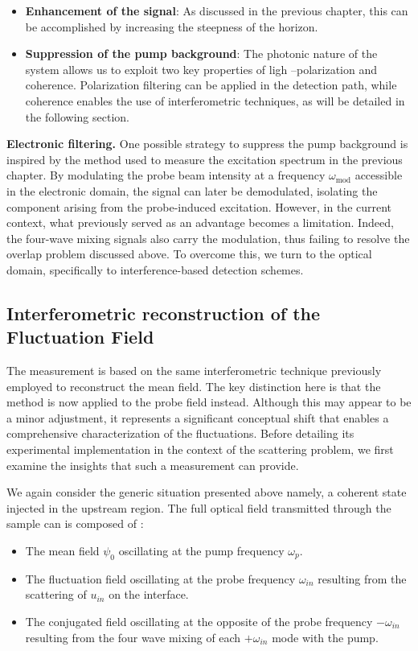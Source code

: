 \begin{itemize}
    \item \textbf{Enhancement of the signal}: As discussed in the previous chapter, this can be accomplished by increasing the steepness of the horizon.
    \item \textbf{Suppression of the pump background}: The photonic nature of the system allows us to exploit two key properties of ligh --polarization and coherence. Polarization filtering can be applied in the detection path, while coherence enables the use of interferometric techniques, as will be detailed in the following section.
\end{itemize}

\textbf{Electronic filtering.} One possible strategy to suppress the pump background is inspired by the method used to measure the excitation spectrum in the previous chapter. By modulating the probe beam intensity at a frequency \(\omega_{\text{mod}}\) accessible in the electronic domain, the signal can later be demodulated, isolating the component arising from the probe-induced excitation. However, in the current context, what previously served as an advantage becomes a limitation. Indeed, the four-wave mixing signals also carry the modulation, thus failing to resolve the overlap problem discussed above. To overcome this, we turn to the optical domain, specifically to interference-based detection schemes.

\subsection{Interferometric reconstruction of the Fluctuation Field}

The measurement is based on the same interferometric technique previously employed to reconstruct the mean field.
 The key distinction here is that the method is now applied to the probe field instead. Although this may appear to be a minor adjustment, it represents a significant conceptual shift that enables a comprehensive characterization of the fluctuations. 
Before detailing its experimental implementation in the context of the scattering problem, we first examine the insights that such a measurement can provide.

\bigskip

We again consider the generic situation presented above namely, a coherent state injected in the upstream region. The full optical field transmitted through
the sample can is composed of :

\begin{itemize}
    \item The mean field $\psi_0$ oscillating at the pump frequency $\omega_p$.
    \item The fluctuation field oscillating at the probe frequency $\omega_{in}$ resulting from the scattering of $u_{in}$ on the interface.
    \item The conjugated field oscillating at the opposite of the probe frequency $-\omega_{in}$ resulting from the four wave mixing of each $+\omega_{in}$ mode with the pump. 
\end{itemize}



